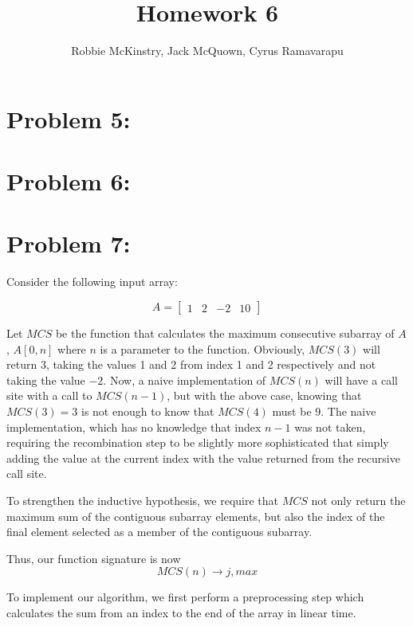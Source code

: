 \documentclass[12pt]{article}
\begin{document}
\title{Homework 6}
\author{Robbie McKinstry, Jack McQuown, Cyrus Ramavarapu}
\renewcommand{\today}{15 September 2016}
\renewcommand{\baselinestretch}{1.5}
\maketitle

\section*{Problem 5: }
\section*{Problem 6: }
\section*{Problem 7: }

Consider the following input array:

\[
A =
  \begin{bmatrix}
    1 & 2 & -2 & 10
  \end{bmatrix}
\]

Let $MCS$ be the function that calculates the maximum consecutive subarray of $A$, $A[0, n]$ where $n$ is a parameter to the function. Obviously, $MCS(3)$ will return $3$, taking the values 1 and 2 from index 1 and 2 respectively and not taking the value $-2$. Now, a naive implementation of $MCS(n)$ will have a call site with a call to $MCS(n-1)$, but with the above case, knowing that $MCS(3) = 3$ is not enough to know that $MCS(4)$ must be 9. The naive implementation, which has no knowledge that index $n-1$ was not taken, requiring the recombination step to be slightly more sophisticated that simply adding the value at the current index with the value returned from the recursive call site.

To strengthen the inductive hypothesis, we require that $MCS$ not only return the maximum sum of the contiguous subarray elements, but also the index of the final element selected as a member of the contiguous subarray.

Thus, our function signature is now
\[
MCS(n) \to j, max
\]

To implement our algorithm, we first perform a preprocessing step which calculates the sum from an index to the end of the array in linear time. \\

\begin{algorithm}[H]
\BlankLine

\end{algorithm}
\end{document}
